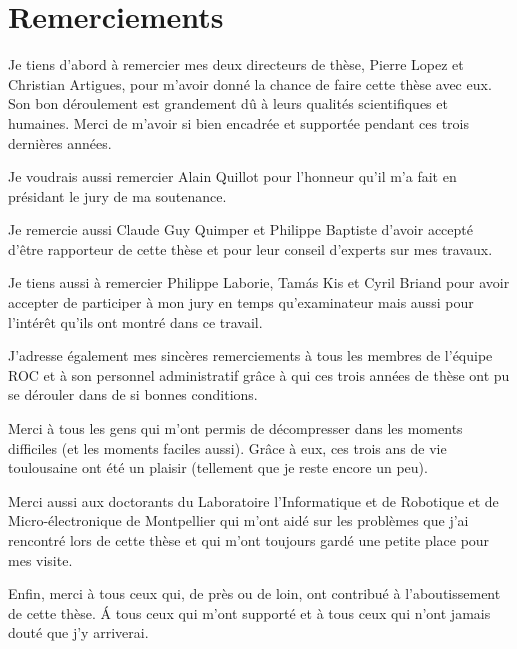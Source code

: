 \chapter*{Remerciements}

Je tiens d'abord à remercier mes deux directeurs de thèse, Pierre
Lopez et Christian Artigues, pour m'avoir donné la chance de faire
cette thèse avec eux. Son bon déroulement est grandement dû à leurs
qualités scientifiques et humaines. Merci de m'avoir si bien encadrée
et supportée pendant ces trois dernières années.

Je voudrais aussi remercier Alain Quillot pour l'honneur qu'il m'a
fait en présidant le jury de ma soutenance. 

Je remercie aussi Claude Guy Quimper et Philippe Baptiste d'avoir
accepté d'être rapporteur de cette thèse et pour leur conseil
d'experts sur mes travaux. 

Je tiens aussi à remercier Philippe Laborie, Tam{\'a}s Kis et Cyril
Briand pour avoir accepter de participer à mon jury en temps
qu'examinateur mais aussi pour l'intérêt qu'ils ont montré dans ce
travail.

J'adresse également mes sincères remerciements à tous les membres de
l'équipe ROC et à son personnel administratif grâce à qui ces trois
années de thèse ont pu se dérouler dans de si bonnes conditions.

Merci à tous les gens qui m'ont permis de décompresser dans les
moments difficiles (et les moments faciles aussi). Grâce à eux, ces
trois ans de vie toulousaine ont été un plaisir (tellement que je
reste encore un peu). 

Merci aussi aux doctorants du Laboratoire l'Informatique et de
Robotique et de Micro-électronique de Montpellier qui m'ont aidé sur
les problèmes que j'ai rencontré lors de cette thèse et qui m'ont
toujours gardé une petite place pour mes visite. 

Enfin, merci à tous ceux qui, de près ou de loin, ont contribué à
l'aboutissement de cette thèse. {\'A} tous ceux qui m'ont supporté et
à tous ceux qui n'ont jamais douté que j'y arriverai. 
